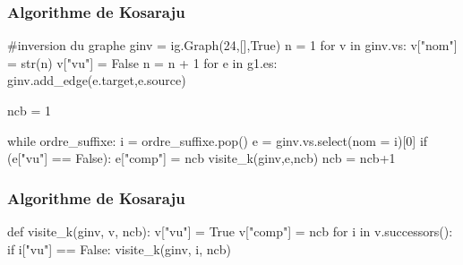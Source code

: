 \begin{frame}[fragile]
\frametitle{Algorithme de Kosaraju}
\begin{pythoncode}    

#inversion du graphe 
ginv = ig.Graph(24,[],True)
n = 1
for v in ginv.vs:
    v["nom"] = str(n) 
    v["vu"] = False 
    n = n + 1
for e in g1.es: 
    ginv.add_edge(e.target,e.source)

ncb = 1

while ordre_suffixe:
    i = ordre_suffixe.pop()
    e = ginv.vs.select(nom = i)[0]
    if (e["vu"] == False):
        e["comp"] = ncb
        visite_k(ginv,e,ncb)
        ncb = ncb+1
\end{pythoncode}
\end{frame}

\begin{frame}[fragile]
    \frametitle{Algorithme de Kosaraju}
    \begin{pythoncode}   
    
    def visite_k(ginv, v, ncb):
        v["vu"] = True
        v["comp"] = ncb
        for i in v.successors():
            if i["vu"] == False:
                visite_k(ginv, i, ncb)
    \end{pythoncode}
    \end{frame}
    